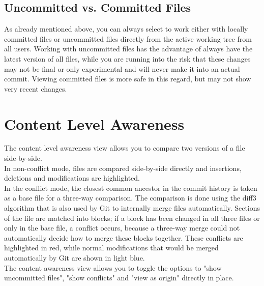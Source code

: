 \subsection{Uncommitted vs. Committed Files}

As already mentioned above, you can always select to work either with locally committed files or uncommitted files directly from the active working tree from all users. Working with uncommitted files has the advantage of always have the latest version of all files, while you are running into the risk that these changes may not be final or only experimental and will never make it into an actual commit. Viewing committed files is more safe in this regard, but may not show very recent changes.







\section{Content Level Awareness}




The content level awareness view allows you to compare two versions of a file side-by-side. \\

In non-conflict mode, files are compared side-by-side directly and insertions, deletions and modifications are highlighted. \\

In the conflict mode, the closest common ancestor in the commit history is taken as a base file for a three-way comparison. The comparison is done using the diff3 algorithm that is also used by Git to internally merge files automatically. Sections of the file are matched into blocks; if a block has been changed in all three files or only in the base file, a conflict occurs, because a three-way merge could not automatically decide how to merge these blocks together. These conflicts are highlighted in red, while normal modifications that would be merged automatically by Git are shown in light blue. \\

The content awareness view allows you to toggle the options to "show uncommitted files", "show conflicts" and "view as origin" directly in place.







